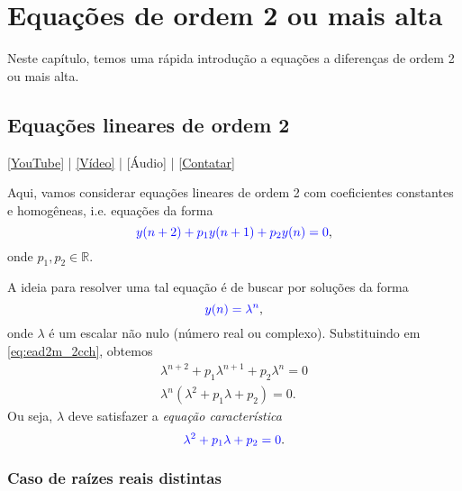 
\chapter{Equações de ordem 2 ou mais alta}\label{cap_ead2m}

Neste capítulo, temos uma rápida introdução a equações a diferenças de ordem 2 ou mais alta.

\section{Equações lineares de ordem 2}\label{cap_ead2m_sec_ead2lin}

\begin{flushright}
  \href{https://youtu.be/Y8-0DOGM-i8}{[YouTube]} | \href{https://archive.org/details/ead-o2h}{[Vídeo]} | [Áudio] | \href{https://phkonzen.github.io/notas/contato.html}{[Contatar]}
\end{flushright}

Aqui, vamos considerar equações lineares de ordem 2 com coeficientes constantes e homogêneas, i.e. equações da forma
\begin{equation}\label{eq:ead2m_2cch}
  {\color{blue}y(n+2)+p_1y(n+1)+p_2y(n)=0},
\end{equation}
onde $p_1,p_2\in\mathbb{R}$.

A ideia para resolver uma tal equação é de buscar por soluções da forma
\begin{equation}
  {\color{blue}y(n)=\lambda^n},
\end{equation}
onde $\lambda$ é um escalar não nulo (número real ou complexo). Substituindo em \eqref{eq:ead2m_2cch}, obtemos
\begin{align}
  \lambda^{n+2}+p_1\lambda^{n+1} + p_2\lambda^n = 0\\
  \lambda^n\left(\lambda^{2}+p_1\lambda + p_2\right) = 0.
\end{align}
Ou seja, $\lambda$ deve satisfazer a \emph{equação característica}
\begin{equation}\label{eq:ead2m_2ec}
  {\color{blue}\lambda^{2}+p_1\lambda + p_2 = 0}.
\end{equation}

\subsection{Caso de raízes reais distintas}

